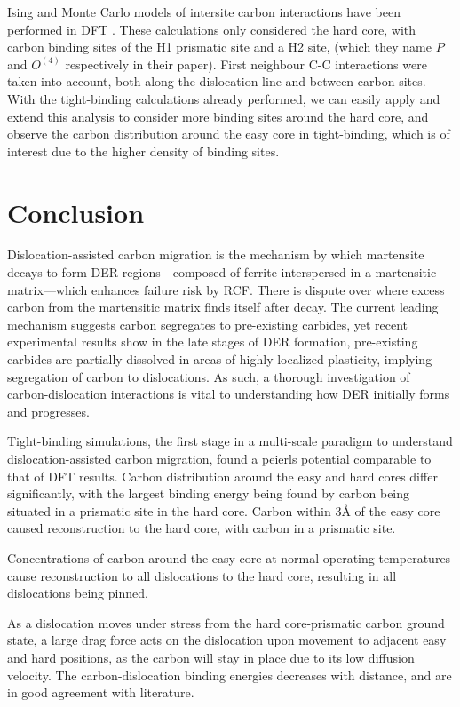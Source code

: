 \documentclass[a4paper,11pt]{article}
\begin{document}
Ising and Monte Carlo models of intersite carbon interactions have been
performed in DFT \cite{Lthi2019}.  These calculations only considered the hard
core, with carbon binding sites of the H1 prismatic site and a H2 site, (which
they name \(P\) and \(O^{(4)}\) respectively in their paper). First neighbour C-C
interactions were taken into account, both along the dislocation line and
between carbon sites. With the tight-binding calculations already performed,
we can easily apply and extend this analysis to consider more
binding sites around the hard core, and observe the carbon
distribution around the easy core in tight-binding, which is of interest due to
the higher density of binding sites.

\section{Conclusion}
\label{sec:orgde20f15}

Dislocation-assisted carbon migration is the mechanism by which martensite decays to form DER
regions---composed of ferrite interspersed in a martensitic matrix---which enhances failure risk
by RCF. There is dispute over where excess carbon from the martensitic matrix finds itself after
decay. The current leading mechanism suggests carbon segregates to pre-existing carbides, yet
recent experimental results show in the late stages of DER formation, pre-existing carbides are partially
dissolved in areas of highly localized plasticity, implying segregation of carbon to
dislocations. As such, a thorough investigation of carbon-dislocation interactions is vital to
understanding how DER initially forms and progresses.

Tight-binding simulations, the first stage in a multi-scale paradigm to understand
dislocation-assisted carbon migration, found a peierls potential comparable to that of DFT
results. Carbon distribution around the easy and hard cores differ significantly, with the largest
binding energy being found by carbon being situated in a prismatic site in the hard core. Carbon
within 3\AA{} of the easy core caused reconstruction to the hard core, with carbon in a prismatic
site. 

Concentrations of carbon around the easy core at normal operating temperatures cause
reconstruction to all dislocations to the hard core, resulting in all dislocations being pinned.

As a dislocation moves under stress from the hard core-prismatic carbon ground state, a large drag force
acts on the dislocation upon movement to adjacent easy and hard positions, as the carbon will stay
in place due to its low diffusion velocity. The carbon-dislocation binding energies decreases with
distance, and are in good agreement with literature. 
\end{document}

